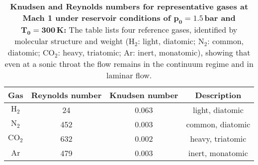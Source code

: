 \begin{table}[ht]
  \centering
  \renewcommand{\arraystretch}{1.4} %
  \begin{tabular}{|c||c|c||c|}
    \hline
    Gas & Reynolds number & Knudsen number & Description \\ \hline \hline
    $\text{H}_2$ & 24 & 0.063 & light, diatomic \\ \hline
    $\text{N}_2$ & 452 & 0.003 & common, diatomic \\ \hline
    $\text{CO}_2$ & 632 & 0.002 & heavy, triatomic \\ \hline
    $\text{Ar}$ & 479 & 0.003 & inert, monatomic \\ \hline
  \end{tabular}
  \caption[Knudsen and Reynolds numbers for representative gases at Mach 1 under reservoir conditions of $p_0=1.5$\,bar and $T_0=300$\,K:]{%
    \textbf{Knudsen and Reynolds numbers for representative gases at Mach 1 under reservoir conditions of $\mathbf{p_0=1.5}$\,bar and $\mathbf{T_0=300}$\,K:}
    The table lists four reference gases, identified by molecular structure and weight
    (H$_2$: light, diatomic; N$_2$: common, diatomic; CO$_2$: heavy, triatomic; Ar: inert, monatomic),
    showing that even at a sonic throat the flow remains in the continuum regime and in laminar flow.
  }
  \label{tab:knudsen_reynolds_discussion}
\end{table}
